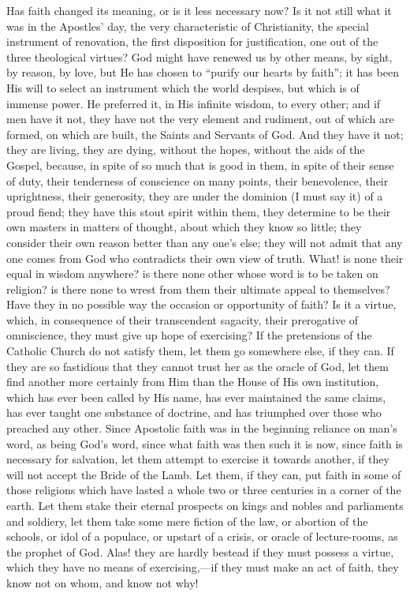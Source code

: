 Has faith changed its meaning, or is it less necessary now? Is it
not still what it was in the Apostles' day, the very characteristic of
Christianity, the special instrument of renovation, the first
disposition for justification, one out of the three theological
virtues? God might have renewed us by other means, by sight, by
reason, by love, but He has chosen to ``purify our hearts by
faith''; it has been His will to select an instrument which the
world despises, but which is of immense power. He preferred it, in His
infinite wisdom, to every other; and if men have it not, they have not
the very element and rudiment, out of which are formed, on which are
built, the Saints and Servants of God. And they have it not; they are
living, they are dying, without the hopes, without the aids of the
Gospel, because, in spite of so much that is good in them, in spite of
their sense of duty, their tenderness of conscience on many points,
their benevolence, their uprightness, their generosity, they are under
the dominion (I must say it) of a proud fiend; they have this stout
spirit within them, they determine to be their own masters in matters
of thought, about which they know so little; they consider their own
reason better than any one's else; they will not admit that any one
comes from God who contradicts their own view of truth. What! is none
their equal in wisdom anywhere? is there none other whose word is to
be taken on religion? is there none to wrest from them their ultimate
appeal to themselves? Have they in no possible way the occasion or
opportunity of faith? Is it a virtue, which, in consequence of their
transcendent sagacity, their prerogative of omniscience, they must
give up hope of exercising? If the pretensions of the Catholic Church
do not satisfy them, let them go somewhere else, if they can. If they
are so fastidious that they cannot trust her as the oracle of God, let
them find another more certainly from Him than the House of His own
institution, which has ever been called by His name, has ever
maintained the same claims, has ever taught one substance of doctrine,
and has triumphed over those who preached any other. Since Apostolic
faith was in the beginning reliance on man's word, as being God's
word, since what faith was then such it is now, since faith is
necessary for salvation, let them attempt to exercise it towards
another, if they will not accept the Bride of the Lamb. Let them, if
they can, put faith in some of those religions which have lasted a
whole two or three centuries in a corner of the earth. Let them stake
their eternal prospects on kings and nobles and parliaments and
soldiery, let them take some mere fiction of the law, or abortion of
the schools, or idol of a populace, or upstart of a crisis, or oracle
of lecture-rooms, as the prophet of God. Alas! they are hardly bestead
if they must possess a virtue, which they have no means of exercising,—if
they must make an act of faith, they know not on whom, and know not
why!

